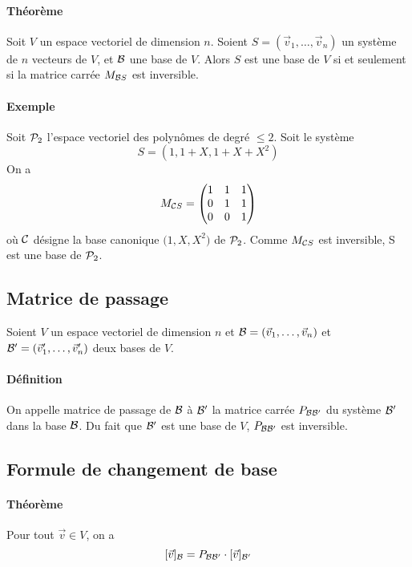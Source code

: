 \paragraph{Théorème} Soit $V$ un espace vectoriel de dimension $n$. Soient $S = (\vec{v}_1, \ldots, \vec{v}_n)$ un système de $n$ vecteurs de $V$, et $\mathcal{B}$ une base de $V$. Alors $S$ est une base de $V$ si et seulement si la matrice carrée $M_{\mathcal{B} S}$ est inversible.

\paragraph{Exemple} Soit $\mathcal{P}_2$ l'espace vectoriel des polynômes de degré $\leq 2$. Soit le système
$$S = (1, 1 + X, 1 + X + X^2)$$
On a 
$$M_{\mathcal{C} S} = \begin{pmatrix}
  1 & 1 & 1 \\
  0 & 1 & 1 \\
  0 & 0 & 1
\end{pmatrix}$$
où $\mathcal{C}$ désigne la base canonique $\big(1, X, X^2 \big)$ de $\mathcal{P}_2$. Comme $M_{\mathcal{C} S}$ est inversible, S est une base de $\mathcal{P}_2$.

%
\subsection{Matrice de passage}
%

Soient $V$ un espace vectoriel de dimension $n$ et $\mathcal{B} = (\vec{v}_1, \ldots, \vec{v}_n)$ et $\mathcal{B}' = (\vec{v}'_1, \ldots, \vec{v}'_n)$ deux bases de $V$.

\paragraph{Définition} On appelle matrice de passage de $\mathcal{B}$ à $\mathcal{B}'$ la matrice carrée $P_{\mathcal{B} \mathcal{B}'}$ du système $\mathcal{B}'$ dans la base $\mathcal{B}$. Du fait que $\mathcal{B}'$ est une base de $V$, $P_{\mathcal{B} \mathcal{B}'}$ est inversible.

%
\subsection{Formule de changement de base}
%
\paragraph{Théorème} Pour tout $\vec{v} \in V$, on a 
$$[\vec{v}]_{\mathcal{B}} = P_{\mathcal{B} \mathcal{B}'} \cdot [\vec{v}]_{\mathcal{B}'}$$

